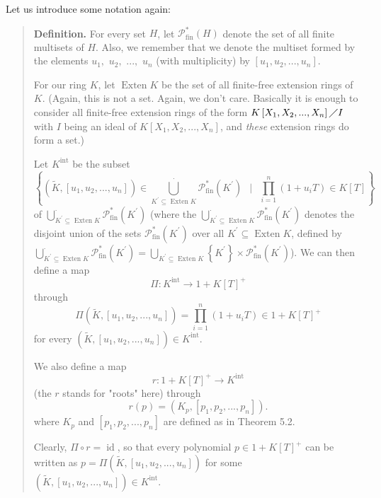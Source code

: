 \documentclass[12pt,final,notitlepage,onecolumn,german]{article}%
\begin{document}
Let us introduce some notation again:

\begin{quote}
\textbf{Definition.} For every set $H$, let $\mathcal{P}_{\operatorname*{fin}%
}^{\ast}\left(  H\right)  $ denote the set of all finite multisets of $H$.
Also, we remember that we denote the multiset formed by the elements $u_{1},$
$u_{2},$ $...,$ $u_{n}$ (with multiplicity) by $\left[  u_{1},u_{2}%
,...,u_{n}\right]  $.

For our ring $K$, let $\operatorname*{Exten}K$ be the set of all finite-free
extension rings of $K$. (Again, this is not a set. Again, we don't care.
Basically it is enough to consider all finite-free extension rings of the form
$K\left[  X_{1},X_{2},...,X_{n}\right]  \diagup I$ with $I$ being an ideal of
$K\left[  X_{1},X_{2},...,X_{n}\right]  $, and \textit{these} extension rings
do form a set.)

Let $K^{\operatorname*{int}}$ be the subset%
\[
\left\{  \left(  \widetilde{K},\left[  u_{1},u_{2},...,u_{n}\right]  \right)
\in\bigcup\limits_{K^{\prime}\subseteq\operatorname*{Exten}K}^{\cdot
}\mathcal{P}_{\operatorname*{fin}}^{\ast}\left(  K^{\prime}\right)
\ \ \mid\ \ \prod\limits_{i=1}^{n}\left(  1+u_{i}T\right)  \in K\left[
T\right]  \right\}
\]
of $\bigcup\limits_{K^{\prime}\subseteq\operatorname*{Exten}K}^{\cdot
}\mathcal{P}_{\operatorname*{fin}}^{\ast}\left(  K^{\prime}\right)  $ (where
the $\bigcup\limits_{K^{\prime}\subseteq\operatorname*{Exten}K}^{\cdot
}\mathcal{P}_{\operatorname*{fin}}^{\ast}\left(  K^{\prime}\right)  $ denotes
the disjoint union of the sets $\mathcal{P}_{\operatorname*{fin}}^{\ast
}\left(  K^{\prime}\right)  $ over all $K^{\prime}\subseteq
\operatorname*{Exten}K$, defined by $\bigcup\limits_{K^{\prime}\subseteq
\operatorname*{Exten}K}^{\cdot}\mathcal{P}_{\operatorname*{fin}}^{\ast}\left(
K^{\prime}\right)  =\bigcup\limits_{K^{\prime}\subseteq\operatorname*{Exten}%
K}\left\{  K^{\prime}\right\}  \times\mathcal{P}_{\operatorname*{fin}}^{\ast
}\left(  K^{\prime}\right)  $). We can then define a map%
\[
\Pi:K^{\operatorname*{int}}\rightarrow1+K\left[  T\right]  ^{+}%
\]
through%
\[
\Pi\left(  \widetilde{K},\left[  u_{1},u_{2},...,u_{n}\right]  \right)
=\prod\limits_{i=1}^{n}\left(  1+u_{i}T\right)  \in1+K\left[  T\right]  ^{+}%
\]
for every $\left(  \widetilde{K},\left[  u_{1},u_{2},...,u_{n}\right]
\right)  \in K^{\operatorname*{int}}$.

We also define a map%
\[
r:1+K\left[  T\right]  ^{+}\rightarrow K^{\operatorname*{int}}%
\]
(the $r$ stands for "roots" here) through
\[
r\left(  p\right)  =\left(  K_{p},\left[  p_{1},p_{2},...,p_{n}\right]
\right)  .
\]
where $K_{p}$ and $\left[  p_{1},p_{2},...,p_{n}\right]  $ are defined as in
Theorem 5.2.

Clearly, $\Pi\circ r=\operatorname*{id}$, so that every polynomial
$p\in1+K\left[  T\right]  ^{+}$ can be written as $p=\Pi\left(  \widetilde
{K},\left[  u_{1},u_{2},...,u_{n}\right]  \right)  $ for some $\left(
\widetilde{K},\left[  u_{1},u_{2},...,u_{n}\right]  \right)  \in
K^{\operatorname*{int}}$.
\end{quote}
\end{document}
